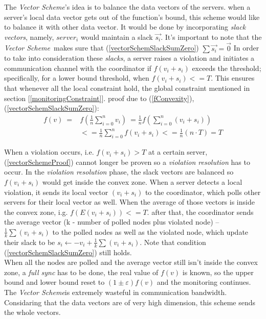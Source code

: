 \documentclass[10pt,a4paper]{article}
\newcommand{\vecScheme}{\textit{Vector Scheme}}
\begin{document}
\begin{multicols*}{2}
The \vecScheme 's idea is to balance the data vectors of the servers. when a server's local data vector gets out of the function's bound, this scheme would like to balance it with other data vector. It would be done by incorporating \textit{slack vectors}, namely, $server_i$ would maintain a slack $\overrightarrow{s_i}$. It's important to note that the \vecScheme \  makes sure that (\label{vectorSchemSlackSumZero}\ref{vectorSchemSlackSumZero}) $\sum{\overrightarrow{s_i}} = \textstyle \overrightarrow{0}$
In order to take into consideration these \textit{slacks}, a server raises a violation and initiates a communication channel with the coordinator if $f(v_i+s_i)$ exceeds the threshold; specifically, for a lower bound threshold, when $f(v_i+s_i) <= T$. This ensures that whenever all the local constraint hold, the global constraint mentioned in section [\ref{monitoringConstraint}]. proof due to (\ref{fConvexity}), (\ref{vectorSchemSlackSumZero}):
\begin{equation}
\label{vectorSchemeProof}
\begin{aligned}
 f(v)  \
	   ={} & f\left(\frac{1}{n} \sum\limits_{i=0}^{n}{v_i}\right)  \
        =   \frac{1}{n} f\left(\sum\limits_{i=0}^{n}{(v_i + s_i)}\right) \\
     & <=   \frac{1}{n} \sum\limits_{i=0}^{n}{f(v_i + s_i)}
       <=   \frac{1}{n}(n \cdot T)
       = T
\end{aligned}
\end{equation}

When a violation occurs, i.e. $f(v_i+s_i)>T$ at a certain server, (\ref{vectorSchemeProof}) cannot longer be proven so a \textit{violation resolution} has to occur. In the \textit{violation resolution} phase, the slack vectors are balanced so $f(v_i+s_i)$ would get inside the convex zone. When a server detects a local violation, it sends its local vector $(v_i + s_i)$ to the coordinator, which polls other servers for their local vector as well. When the average of those vectors is inside the convex zone, i.g. $f(E(v_i + s_i)) <= T$. after that, the coordinator sends the average vector (k - number of polled nodes plus violated node) -- $\frac{1}{k}\sum{(v_i + s_i)}$ to the polled nodes as well as the violated node, which update their slack to be $s_i \leftarrow -v_i + \frac{1}{k}\sum{(v_i + s_i)} $. Note that condition (\ref{vectorSchemSlackSumZero}) still holds. \\
When all the nodes are polled and the average vector still isn't inside the convex zone, a \textit{full sync} has to be done, the real value of $f(v)$ is known, so the upper bound and lower bound reset to $(1 \pm \varepsilon )f(v)$ and the monitoring continues. \\
The \vecScheme is extremely wasteful in communication bandwidth. Considaring that the data vectors are of very high dimension, this scheme sends the whole vectors.


\end{multicols*}
\end{document}
